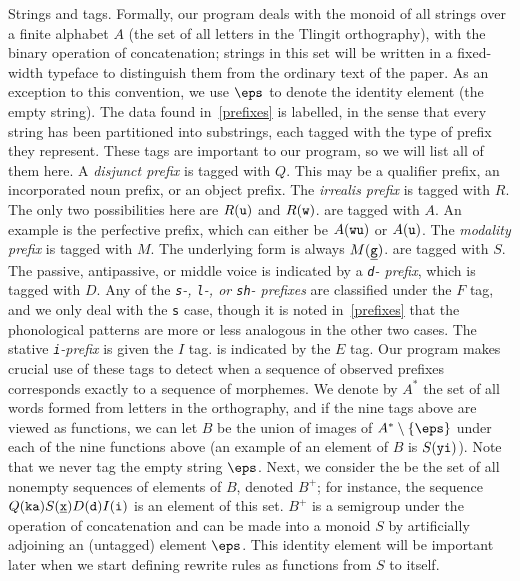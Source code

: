 \medskip
\boldlabel Strings and tags.
Formally, our program deals with the monoid of all strings over a finite alphabet $A$ (the set of all
letters in the Tlingit orthography), with the binary
operation of concatenation; strings in this set
will be written in a fixed-width typeface to distinguish them from the ordinary text of the paper. As an exception
to this convention, we use $\eps$ to denote the identity element (the empty string).
The data found in~\ref{prefixes}
is labelled, in the sense that every string has been partitioned into substrings,
each tagged with the type of prefix they represent. These tags are important to our program, so we will list
all of them here.
\medskip\resetnum
\numitem A {\it disjunct prefix} is tagged with $Q$. This may be a qualifier prefix, an incorporated noun
prefix, or an object prefix.
\smallskip
\numitem The {\it irrealis prefix} is tagged with $R$. The only two possibilities here are $\R u$ and $\R w$.
\smallskip
{} are tagged with $A$. An example is the perfective prefix, which can either
be $\A{wu}$ or $\A u$.
\smallskip
\numitem The {\it modality prefix} is tagged with $M$. The underlying form is always $\M\g$.
\smallskip
{} are tagged with $S$.
\smallskip
\numitem The passive, antipassive, or middle voice is indicated by a {\it {\tt d}- prefix},
which is tagged with $D$.
\smallskip
\numitem Any of the {\it {\tt s}-, {\tt l}-, or {\tt sh}- prefixes} are classified under the $F$ tag, and
we only deal with the {\tt s} case, though it is noted in~\ref{prefixes} that the phonological patterns
are more or less analogous in the other two cases.
\smallskip
\numitem The stative {\it {\tt i}-prefix} is given the $I$ tag.
\smallskip
{} is indicated by the $E$ tag.
\medskip
Our program makes crucial use of these tags to detect when a sequence of observed prefixes corresponds exactly
to a sequence of morphemes. We denote by $A^*$ the set of all words formed from letters in the orthography, and
if the nine tags above are viewed as functions, we can let $B$ be the union of images of $A^*\setminus\{\eps\}$
under each of the nine functions above (an example of an element of $B$ is $\S{yi}$). Note that we never tag
the empty string $\eps$. Next, we consider the be the set of all nonempty sequences of elements of $B$,
denoted $B^+$; for instance, the sequence $\Q{ka}\S{\x}\D{d}\I{i}$ is an element of this set.
$B^+$ is a semigroup under
the operation of concatenation and can be made into a monoid $S$ by artificially adjoining an (untagged)
element $\eps$. This identity element will be important later when we start defining rewrite rules as functions
from $S$ to itself.


